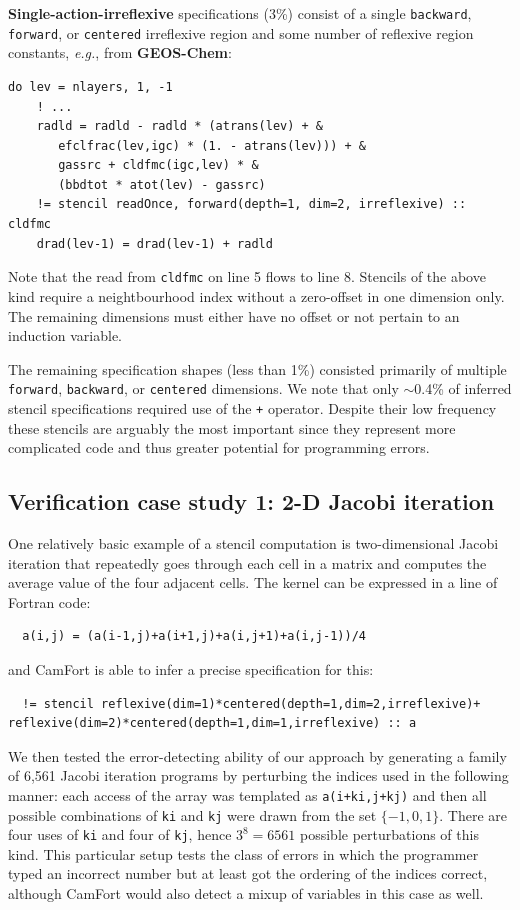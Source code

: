 \documentclass[9pt]{sigplanconf}
\theoremstyle{definition}
\newcommand{\eg}{\emph{e.g.}}
\newcommand{\term}[1]{\texttt{#1}}
\begin{document}
\textbf{Single-action-irreflexive} specifications (3\%) consist of a single
\term{backward}, \term{forward}, or \term{centered} irreflexive region 
and some number of reflexive region constants, \eg{}, from \textbf{GEOS-Chem}:
\begin{verbatim}
do lev = nlayers, 1, -1
    ! ...
    radld = radld - radld * (atrans(lev) + &
       efclfrac(lev,igc) * (1. - atrans(lev))) + &
       gassrc + cldfmc(igc,lev) * &
       (bbdtot * atot(lev) - gassrc)
    != stencil readOnce, forward(depth=1, dim=2, irreflexive) :: cldfmc
    drad(lev-1) = drad(lev-1) + radld
\end{verbatim}
Note that the read from 
\texttt{cldfmc} on line 5 flows to line 8. Stencils of
the above kind require a neightbourhood index without a zero-offset in
one dimension only. The remaining dimensions must either have no
offset or not pertain to an induction variable.

The remaining specification shapes (less than 1\%) consisted
primarily of multiple \term{forward}, \term{backward}, or
\term{centered} dimensions. We note that only $\sim$0.4\% of inferred
stencil specifications required use of the \term{+} operator. Despite their low frequency these stencils are arguably the most important since they represent more complicated code and thus greater potential for programming errors.

\subsection{Verification case study 1: 2-D Jacobi iteration}

One relatively basic example of a stencil computation is two-dimensional
Jacobi iteration that repeatedly goes through each cell in a matrix
and computes the average value of the four adjacent cells. The kernel
can be expressed in a line of Fortran code:
\begin{verbatim}
  a(i,j) = (a(i-1,j)+a(i+1,j)+a(i,j+1)+a(i,j-1))/4
\end{verbatim}
and CamFort is able to infer a precise specification for this:
\begin{verbatim}
  != stencil reflexive(dim=1)*centered(depth=1,dim=2,irreflexive)+ reflexive(dim=2)*centered(depth=1,dim=1,irreflexive) :: a
\end{verbatim}
We then tested the error-detecting ability of our approach by 
generating a family of 6,561 Jacobi iteration programs by perturbing
the indices used in the following manner: each access of the array was
templated as \texttt{a(i+ki,j+kj)} and then all possible
combinations of \texttt{ki} and \texttt{kj}
were drawn from the set $\{-1,0,1\}$. There are four uses of
\texttt{ki} and four of \texttt{kj}, hence
$3^8=6561$ possible perturbations of this kind. This particular setup
tests the class of errors in which the programmer typed an incorrect
number but at least got the ordering of the indices correct, although
CamFort would also detect a mixup of variables in this case as well.
\end{document}
